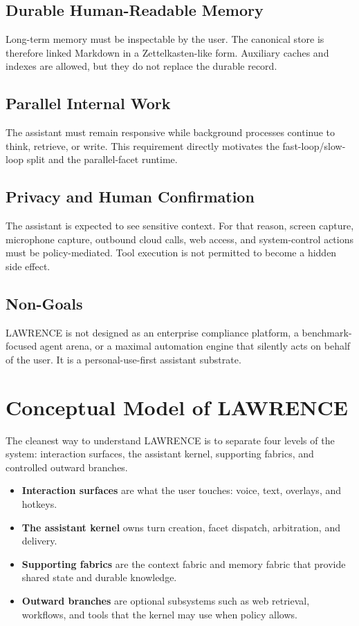 \documentclass[conference]{IEEEtran}
\begin{document}
\subsection{Durable Human-Readable Memory}
Long-term memory must be inspectable by the user. The canonical store is therefore linked Markdown in a Zettelkasten-like form. Auxiliary caches and indexes are allowed, but they do not replace the durable record.

\subsection{Parallel Internal Work}
The assistant must remain responsive while background processes continue to think, retrieve, or write. This requirement directly motivates the fast-loop/slow-loop split and the parallel-facet runtime.

\subsection{Privacy and Human Confirmation}
The assistant is expected to see sensitive context. For that reason, screen capture, microphone capture, outbound cloud calls, web access, and system-control actions must be policy-mediated. Tool execution is not permitted to become a hidden side effect.

\subsection{Non-Goals}
LAWRENCE is not designed as an enterprise compliance platform, a benchmark-focused agent arena, or a maximal automation engine that silently acts on behalf of the user. It is a personal-use-first assistant substrate.

\section{Conceptual Model of LAWRENCE}
The cleanest way to understand LAWRENCE is to separate four levels of the system: interaction surfaces, the assistant kernel, supporting fabrics, and controlled outward branches.

\begin{itemize}
\item \textbf{Interaction surfaces} are what the user touches: voice, text, overlays, and hotkeys.
\item \textbf{The assistant kernel} owns turn creation, facet dispatch, arbitration, and delivery.
\item \textbf{Supporting fabrics} are the context fabric and memory fabric that provide shared state and durable knowledge.
\item \textbf{Outward branches} are optional subsystems such as web retrieval, workflows, and tools that the kernel may use when policy allows.
\end{itemize}
\end{document}
